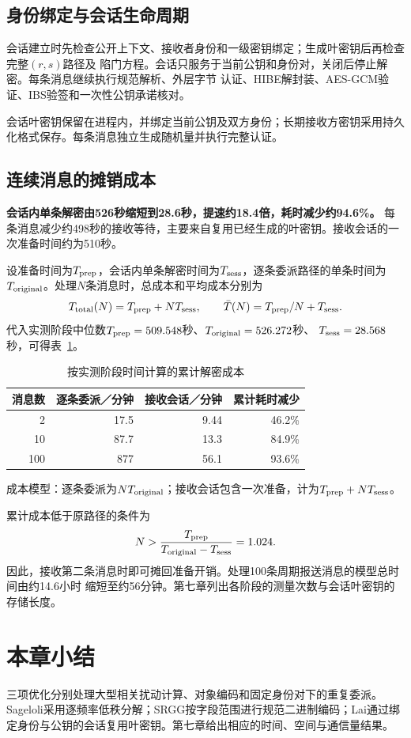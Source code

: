\subsection{身份绑定与会话生命周期}

会话建立时先检查公开上下文、接收者身份和一级密钥绑定；生成叶密钥后再检查完整$(r,s)$路径及
陷门方程。会话只服务于当前公钥和身份对，关闭后停止解密。每条消息继续执行规范解析、外层字节
认证、HIBE解封装、AES-GCM验证、IBS验签和一次性公钥承诺核对。

会话叶密钥保留在进程内，并绑定当前公钥及双方身份；长期接收方密钥采用持久化格式保存。每条消息独立生成随机量并执行完整认证。

\subsection{连续消息的摊销成本}

\textbf{会话内单条解密由526秒缩短到28.6秒，提速约18.4倍，耗时减少约94.6\%。}
每条消息减少约498秒的接收等待，主要来自复用已经生成的叶密钥。接收会话的一次准备时间约为510秒。

设准备时间为$T_{\rm prep}$，会话内单条解密时间为$T_{\rm sess}$，逐条委派路径的单条时间为
$T_{\rm original}$。处理$N$条消息时，总成本和平均成本分别为
\[
 T_{\rm total}(N)=T_{\rm prep}+NT_{\rm sess},\qquad
 \bar T(N)=T_{\rm prep}/N+T_{\rm sess}.
\]
代入实测阶段中位数$T_{\rm prep}=509.548$秒、$T_{\rm original}=526.272$秒、
$T_{\rm sess}=28.568$秒，可得表~\ref{tab:session-amortization}。

\begin{table}[H]
\centering\small
\caption{按实测阶段时间计算的累计解密成本}
\label{tab:session-amortization}
\begin{tabular}{@{}rrrr@{}}
\toprule
\rowcolor{black!8} 消息数 & 逐条委派／分钟 & 接收会话／分钟 & 累计耗时减少 \\
\midrule
2 & 17.5 & 9.44 & 46.2\% \\
10 & 87.7 & 13.3 & 84.9\% \\
100 & 877 & 56.1 & 93.6\% \\
\bottomrule
\end{tabular}
\par\smallskip\begin{minipage}{.96\textwidth}\footnotesize
成本模型：逐条委派为$NT_{\rm original}$；接收会话包含一次准备，计为$T_{\rm prep}+NT_{\rm sess}$。
\end{minipage}
\end{table}

累计成本低于原路径的条件为
\[
 N>\frac{T_{\rm prep}}{T_{\rm original}-T_{\rm sess}}=1.024.
\]
因此，接收第二条消息时即可摊回准备开销。处理100条周期报送消息的模型总时间由约14.6小时
缩短至约56分钟。第七章列出各阶段的测量次数与会话叶密钥的存储长度。

\section{本章小结}

三项优化分别处理大型相关扰动计算、对象编码和固定身份对下的重复委派。Sageloli采用逐频率低秩分解；SRGG按字段范围进行规范二进制编码；Lai通过绑定身份与公钥的会话复用叶密钥。第七章给出相应的时间、空间与通信量结果。
